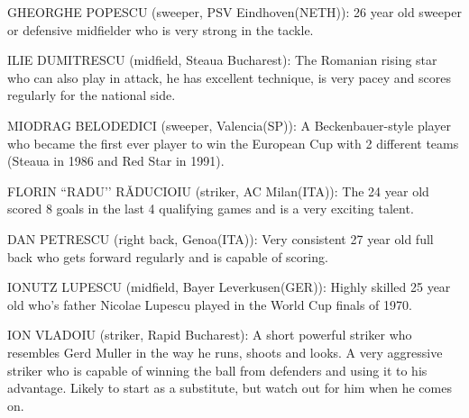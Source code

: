 GHEORGHE POPESCU (sweeper, PSV Eindhoven(NETH)):
26 year old sweeper or defensive midfielder who is very strong in the tackle.

ILIE DUMITRESCU (midfield, Steaua Bucharest):
The Romanian rising star who can also play in attack, he has excellent 
technique, is very pacey and scores regularly for the national side.

MIODRAG BELODEDICI (sweeper, Valencia(SP)):
A Beckenbauer-style player who became the first ever player to win the 
European Cup with 2 different teams (Steaua in 1986 and Red Star in 1991).
 
FLORIN ``RADU’’ R\v{A}DUCIOIU (striker, AC Milan(ITA)):
The 24 year old scored 8 goals in the last 4 qualifying games and is a very 
exciting talent.

DAN PETRESCU (right back, Genoa(ITA)):
Very consistent 27 year old full back who gets forward regularly and is capable
of scoring.

IONUTZ LUPESCU (midfield, Bayer Leverkusen(GER)):
Highly skilled 25 year old who's father Nicolae Lupescu played in the World Cup
finals of 1970.

ION VLADOIU (striker, Rapid Bucharest):
A short powerful striker who resembles Gerd Muller in the way he runs, shoots
and looks. A very aggressive striker who is capable of winning the ball from
defenders and using it to his advantage. Likely to start as a substitute, but
watch out for him when he comes on.
